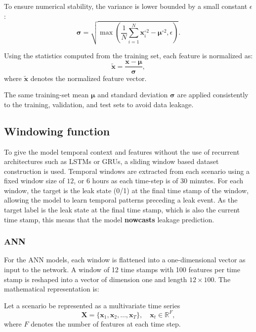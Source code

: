 \documentclass[final,5p,times,twocolumn,authoryear]{elsarticle}
\begin{document}
To ensure numerical stability, the variance is lower bounded by a small constant
$\epsilon$:
\begin{equation}
\boldsymbol{\sigma} =
\sqrt{
\max\left(
\frac{1}{N} \sum_{i=1}^{N} \mathbf{x}_i^{\circ 2}
- \boldsymbol{\mu}^{\circ 2},
\epsilon
\right)
}.
\end{equation}

Using the statistics computed from the training set, each feature is normalized
as:
\begin{equation}
\tilde{\mathbf{x}} =
\frac{\mathbf{x} - \boldsymbol{\mu}}{\boldsymbol{\sigma}},
\end{equation}
where $\tilde{\mathbf{x}}$ denotes the normalized feature vector.

The same training-set mean $\boldsymbol{\mu}$ and standard deviation
$\boldsymbol{\sigma}$ are applied consistently to the training, validation, and
test sets to avoid data leakage.

\subsection{Windowing function}

To give the model temporal context and features without the use of recurrent architectures such as LSTMs or GRUs, a sliding window based dataset construction is used. Temporal windows are extracted from each scenario using a fixed window size of $12$, or 6 hours as each time-step is of 30 minutes. For each window, the target is the leak state (0/1) at the final time stamp of the window, allowing the model to learn temporal patterns preceding a leak event. As the target label is the leak state at the final time stamp, which is also the current time stamp, this means that the model \textbf{nowcasts} leakage prediction.

\subsubsection{ANN}

For the ANN models, each window is flattened into a one-dimensional vector as input to the network. A window of 12 time stamps with 100 features per time stamp is reshaped into a vector of dimension one and length $12\times100$. The mathematical representation is:

Let a scenario be represented as a multivariate time series
\begin{equation}
\mathbf{X} = \{\mathbf{x}_1, \mathbf{x}_2, \dots, \mathbf{x}_T\},
\quad
\mathbf{x}_t \in \mathbb{R}^{F},
\end{equation}
where $F$ denotes the number of features at each time step.
\end{document}
